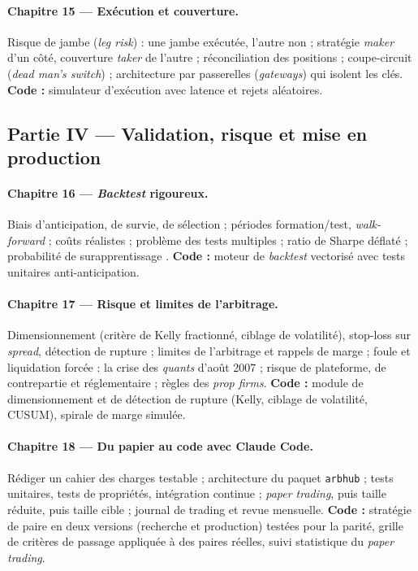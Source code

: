\paragraph{Chapitre 15 — Exécution et couverture.}
Risque de jambe (\emph{leg risk}) : une jambe exécutée, l'autre non ; stratégie \emph{maker} d'un côté, couverture \emph{taker} de l'autre ; réconciliation des positions ; coupe-circuit (\emph{dead man's switch}) ; architecture par passerelles (\emph{gateways}) qui isolent les clés. \textbf{Code :} simulateur d'exécution avec latence et rejets aléatoires.

\subsection{Partie IV — Validation, risque et mise en production}

\paragraph{Chapitre 16 — \emph{Backtest} rigoureux.}
Biais d'anticipation, de survie, de sélection ; périodes formation/test, \emph{walk-forward} ; coûts réalistes ; problème des tests multiples \citep{harvey2016} ; ratio de Sharpe déflaté \citep{bailey2014dsr} ; probabilité de surapprentissage \citep{bailey2017pbo}. \textbf{Code :} moteur de \emph{backtest} vectorisé avec tests unitaires anti-anticipation.

\paragraph{Chapitre 17 — Risque et limites de l'arbitrage.}
Dimensionnement (critère de Kelly fractionné, ciblage de volatilité), stop-loss sur \emph{spread}, détection de rupture ; limites de l'arbitrage et rappels de marge \citep{shleifer1997} ; foule et liquidation forcée : la crise des \emph{quants} d'août 2007 \citep{khandanilo2011} ; risque de plateforme, de contrepartie et réglementaire ; règles des \emph{prop firms}. \textbf{Code :} module de dimensionnement et de détection de rupture (Kelly, ciblage de volatilité, CUSUM), spirale de marge simulée.

\paragraph{Chapitre 18 — Du papier au code avec Claude Code.}
Rédiger un cahier des charges testable ; architecture du paquet \texttt{arbhub} ; tests unitaires, tests de propriétés, intégration continue ; \emph{paper trading}, puis taille réduite, puis taille cible ; journal de trading et revue mensuelle. \textbf{Code :} stratégie de paire en deux versions (recherche et production) testées pour la parité, grille de critères de passage appliquée à des paires réelles, suivi statistique du \emph{paper trading}.

